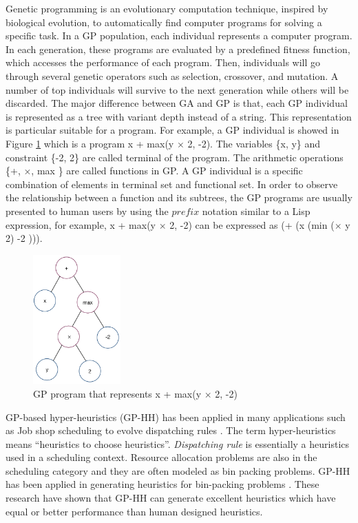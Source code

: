 Genetic programming \cite{1992gppc.book.....K} is an evolutionary computation technique, inspired by biological evolution, to automatically find 
computer programs for solving a specific task. In a GP population, each individual represents a computer program. In each generation, these programs are evaluated by a predefined fitness function, which accesses the performance of each program. Then, individuals will go through several genetic operators such as selection, crossover, and mutation. A number of top individuals will survive to the next generation while others will be discarded. The major difference between GA and GP is that, each GP individual is represented as a tree with variant depth instead of a string. This representation is particular suitable for a program. For example,  a GP individual is showed in Figure \ref{fig:gp_program} which is a program x + max(y $\times$ 2, -2). The variables \{x, y\} and constraint \{-2, 2\} are called terminal of the program. The arithmetic operations \{+, $\times$, max \} are called functions in GP. A GP individual is a specific combination of elements in terminal set and functional set. In order to observe the relationship between a function and its subtrees, the GP programs are usually presented to human users by using the $prefix$ notation similar to a Lisp expression, for example, x + max(y $\times$ 2, -2) can be expressed as (+ (x (min ($\times$ y 2) -2 ))).

\begin{figure}
	\centering
	\includegraphics[width=0.3\textwidth]{pics/gp-tree.png}
	\caption{GP program that represents x + max(y $\times$ 2, -2)}
	\label{fig:gp_program}
\end{figure}


GP-based hyper-heuristics (GP-HH)  has been applied in many applications such as Job shop scheduling to evolve dispatching rules \cite{Nguyen:2014eu}. The term hyper-heuristics \cite{Cowling:2000ek} means ``heuristics to choose heuristics''.
\emph{Dispatching rule} is essentially a heuristics \cite{Panwalkar:1977fw} used in a scheduling context. 
Resource allocation problems are also in the scheduling category and they are often modeled as bin packing problems. 
GP-HH has been applied in generating heuristics for bin-packing problems \cite{Poli:2007kt,Sim:2013fe,Burke:2012gs}. These research have shown that GP-HH can generate excellent heuristics which have equal or better performance than human designed heuristics.

